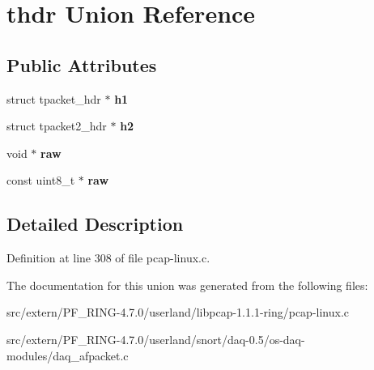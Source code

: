 \hypertarget{unionthdr}{
\section{thdr Union Reference}
\label{unionthdr}
}
\subsection*{Public Attributes}
\begin{DoxyCompactItemize}
\item 
\hypertarget{unionthdr_a893cf170458018378da8067c71b928c6}{
struct tpacket\_\-hdr $\ast$ {\bfseries h1}}
\label{unionthdr_a893cf170458018378da8067c71b928c6}

\item 
\hypertarget{unionthdr_a45cbd75dc1641d637a6285dcfbc1bea2}{
struct tpacket2\_\-hdr $\ast$ {\bfseries h2}}
\label{unionthdr_a45cbd75dc1641d637a6285dcfbc1bea2}

\item 
\hypertarget{unionthdr_a2b35f7de06a4a1b0f017a9ea39d2db65}{
void $\ast$ {\bfseries raw}}
\label{unionthdr_a2b35f7de06a4a1b0f017a9ea39d2db65}

\item 
\hypertarget{unionthdr_a58716742834964b63efec78634f168f2}{
const uint8\_\-t $\ast$ {\bfseries raw}}
\label{unionthdr_a58716742834964b63efec78634f168f2}

\end{DoxyCompactItemize}


\subsection{Detailed Description}


Definition at line 308 of file pcap-\/linux.c.



The documentation for this union was generated from the following files:\begin{DoxyCompactItemize}
\item 
src/extern/PF\_\-RING-\/4.7.0/userland/libpcap-\/1.1.1-\/ring/pcap-\/linux.c\item 
src/extern/PF\_\-RING-\/4.7.0/userland/snort/daq-\/0.5/os-\/daq-\/modules/daq\_\-afpacket.c\end{DoxyCompactItemize}
